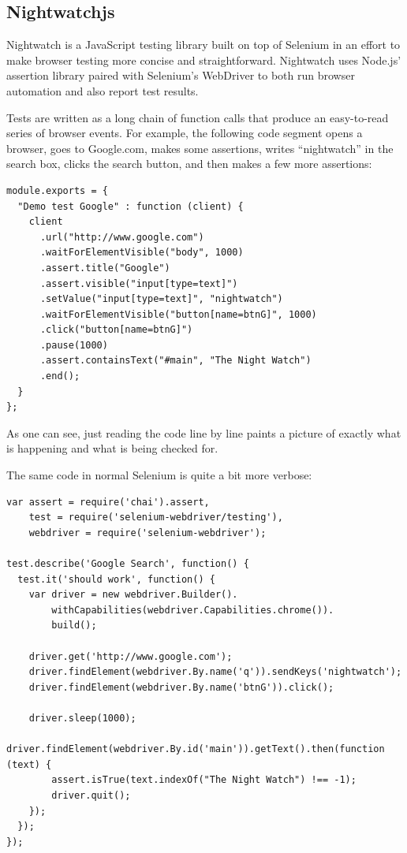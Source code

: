 \documentclass[12pt]{ucthesis}
\begin{document}
\subsection{Nightwatchjs}
Nightwatch\cite{NightwatchJS} is a JavaScript testing library built on top of Selenium in an effort to make browser testing more concise and straightforward. Nightwatch uses Node.js' assertion library paired with Selenium's WebDriver to both run browser automation and also report test results.

Tests are written as a long chain of function calls that produce an easy-to-read series of browser events. For example, the following code segment opens a browser, goes to Google.com, makes some assertions, writes ``nightwatch'' in the search box, clicks the search button, and then makes a few more assertions:
\begin{lstlisting}
module.exports = {
  "Demo test Google" : function (client) {
    client
      .url("http://www.google.com")
      .waitForElementVisible("body", 1000)
      .assert.title("Google")
      .assert.visible("input[type=text]")
      .setValue("input[type=text]", "nightwatch")
      .waitForElementVisible("button[name=btnG]", 1000)
      .click("button[name=btnG]")
      .pause(1000)
      .assert.containsText("#main", "The Night Watch")
      .end();
  }
};
\end{lstlisting}
As one can see, just reading the code line by line paints a picture of exactly what is happening and what is being checked for. 

The same code in normal Selenium is quite a bit more verbose:
\begin{lstlisting}
var assert = require('chai').assert,
    test = require('selenium-webdriver/testing'),
    webdriver = require('selenium-webdriver');

test.describe('Google Search', function() {
  test.it('should work', function() {
    var driver = new webdriver.Builder().
        withCapabilities(webdriver.Capabilities.chrome()).
        build();

    driver.get('http://www.google.com');
    driver.findElement(webdriver.By.name('q')).sendKeys('nightwatch');
    driver.findElement(webdriver.By.name('btnG')).click();

    driver.sleep(1000);
    driver.findElement(webdriver.By.id('main')).getText().then(function (text) {
        assert.isTrue(text.indexOf("The Night Watch") !== -1);
        driver.quit();
    });
  });
});
\end{lstlisting}
\end{document}
